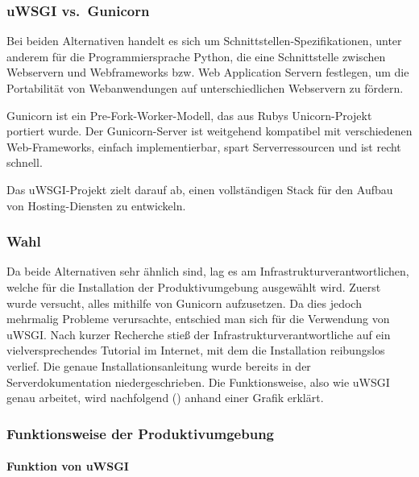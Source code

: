 \documentclass[
]{article}
\begin{document}
\hypertarget{uwsgi-vs.-gunicorn}{%
\subsubsection{uWSGI vs.~Gunicorn}\label{uwsgi-vs.-gunicorn}}

Bei beiden Alternativen handelt es sich um
Schnittstellen-Spezifikationen, unter anderem für die Programmiersprache
Python, die eine Schnittstelle zwischen Webservern und Webframeworks
bzw. Web Application Servern festlegen, um die Portabilität von
Webanwendungen auf unterschiedlichen Webservern zu fördern.

Gunicorn ist ein Pre-Fork-Worker-Modell\cite{prefork}, das aus Rubys
Unicorn-Projekt portiert wurde. Der Gunicorn-Server ist weitgehend
kompatibel mit verschiedenen Web-Frameworks, einfach implementierbar,
spart Serverressourcen und ist recht schnell.

Das uWSGI-Projekt zielt darauf ab, einen vollständigen Stack für den
Aufbau von Hosting-Diensten zu entwickeln.

\hypertarget{wahl}{%
\subsubsection{Wahl}\label{wahl}}

Da beide Alternativen sehr ähnlich sind, lag es am
Infrastrukturverantwortlichen, welche für die Installation der
Produktivumgebung ausgewählt wird. Zuerst wurde versucht, alles mithilfe
von Gunicorn aufzusetzen. Da dies jedoch mehrmalig Probleme verursachte,
entschied man sich für die Verwendung von uWSGI. Nach kurzer Recherche
stieß der Infrastrukturverantwortliche auf ein vielversprechendes
Tutorial im Internet\cite{tutorialuwsgi}, mit dem die Installation
reibungslos verlief. Die genaue Installationsanleitung wurde bereits in
der Serverdokumentation niedergeschrieben. Die Funktionsweise, also wie
uWSGI genau arbeitet, wird nachfolgend ()
anhand einer Grafik erklärt.

\hypertarget{funktionsweise-der-produktivumgebung}{%
\subsubsection{Funktionsweise der
Produktivumgebung}\label{funktionsweise-der-produktivumgebung}}

\hypertarget{funktion-von-uwsgi}{%
\paragraph{Funktion von uWSGI}\label{funktion-von-uwsgi}}
\end{document}
